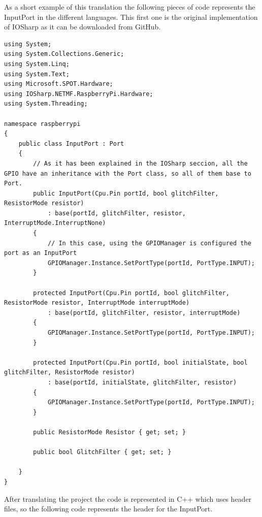 As a short example of this translation the following pieces of code represents the InputPort in the different languages. This first one is the original implementation of IOSharp as it can be downloaded from GitHub.
\begin{lstlisting}[language=CSharp, caption={InputPort in C\#}]
using System;
using System.Collections.Generic;
using System.Linq;
using System.Text;
using Microsoft.SPOT.Hardware;
using IOSharp.NETMF.RaspberryPi.Hardware;
using System.Threading;

namespace raspberrypi
{
    public class InputPort : Port
    {
    	// As it has been explained in the IOSharp seccion, all the GPIO have an inheritance with the Port class, so all of them base to Port.
        public InputPort(Cpu.Pin portId, bool glitchFilter, ResistorMode resistor)
            : base(portId, glitchFilter, resistor, InterruptMode.InterruptNone)
        {
        	// In this case, using the GPIOManager is configured the port as an InputPort
            GPIOManager.Instance.SetPortType(portId, PortType.INPUT);
        }

        protected InputPort(Cpu.Pin portId, bool glitchFilter, ResistorMode resistor, InterruptMode interruptMode)
            : base(portId, glitchFilter, resistor, interruptMode)
        {
            GPIOManager.Instance.SetPortType(portId, PortType.INPUT);
        }

        protected InputPort(Cpu.Pin portId, bool initialState, bool glitchFilter, ResistorMode resistor)
            : base(portId, initialState, glitchFilter, resistor)
        {
            GPIOManager.Instance.SetPortType(portId, PortType.INPUT);
        }

        public ResistorMode Resistor { get; set; }

        public bool GlitchFilter { get; set; }

    }
}
\end{lstlisting}
After translating the project the code is represented in C++ which  uses header files, so the following code represents the header for the InputPort.

